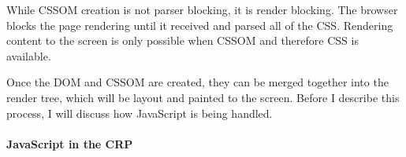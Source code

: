 




While CSSOM creation is not parser blocking, it is render blocking.
The browser blocks the page rendering until it received and parsed all of the CSS.
Rendering content to the screen is only possible when CSSOM and therefore CSS is available. %



Once the DOM and CSSOM are created, they can be merged together into the render tree, which will be layout and painted to the screen.
Before I describe this process, I will discuss how JavaScript is being handled.















\paragraph{JavaScript in the CRP}


